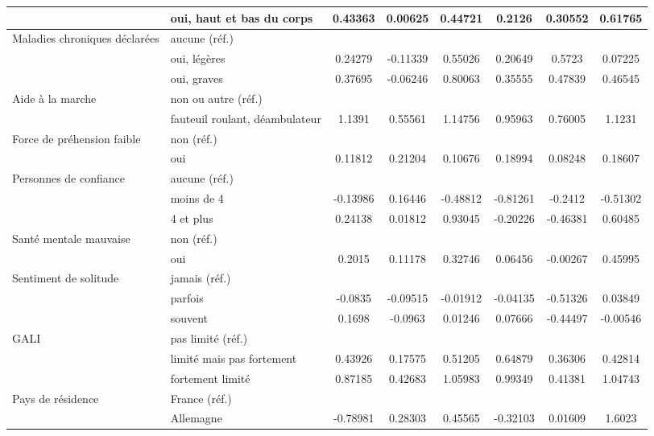 \begin{Article}
\begin{refsection}[Bonnal]
\begin{table}
{\begin{threeparttable}
\begin{tabular}{l@{}l@{} S!{\qquad}S!{\qquad}S!{\quad} |S!{\qquad}S!{\qquad}S!{\quad}}
	& oui, haut et bas du corps & 0.43363\sym{***} & 0.00625 & 0.44721\sym{***} & 0.2126 & 0.30552 & 0.61765\sym{***}\\\hline
	Maladies chroniques déclarées & aucune (réf.) && & && &\\
	& oui, légères & 0.24279\sym{**} & -0.11339 & 0.55026\sym{***} & 0.20649 & 0.5723 & 0.07225\\
	& oui, graves & 0.37695\sym{***} & -0.06246 & 0.80063\sym{***} & 0.35555 & 0.47839 & 0.46545\\\hline
	Aide à la marche & non ou autre (réf.) && & && &\\
	& fauteuil roulant, déambulateur & 1.1391\sym{***} & 0.55561\sym{***} & 1.14756\sym{***} & 0.95963\sym{***} & 0.76005\sym{***} & 1.1231\sym{***}\\\hline
	Force de préhension faible & non (réf.) && &  && & \\
	& oui & 0.11812 & 0.21204\sym{***} & 0.10676 & 0.18994\sym{*} & 0.08248 & 0.18607\\\hline
	Personnes de confiance & aucune (réf.) && &  && & \\
	& moins de 4 & -0.13986 & 0.16446 & -0.48812 & -0.81261\sym{**} & -0.2412 & -0.51302\\
	& 4 et plus & 0.24138\sym{*} & 0.01812 & 0.93045\sym{***} & -0.20226 & -0.46381 & 0.60485\sym{*}\\\hline
	Santé mentale mauvaise & non (réf.) && &&  & & \\
	& oui & 0.2015\sym{***} & 0.11178 & 0.32746\sym{***} & 0.06456 & -0.00267 & 0.45995\sym{***}\\\hline
	Sentiment de solitude& jamais (réf.) && &  && & \\
	& parfois & -0.0835 & -0.09515 & -0.01912 & -0.04135 & -0.51326\sym{***} & 0.03849\\
	& souvent & 0.1698\sym{**} & -0.0963 & 0.01246 & 0.07666 & -0.44497\sym{**} & -0.00546\\\hline
	GALI & pas limité (réf.) &  &  &  &  &  & \\
	& limité mais pas fortement & 0.43926\sym{***} & 0.17575\sym{**} & 0.51205\sym{***} & 0.64879\sym{***} & 0.36306 & 0.42814\sym{*}\\
	& fortement limité & 0.87185\sym{***} & 0.42683\sym{***} & 1.05983\sym{***} & 0.99349\sym{***} & 0.41381 & 1.04743\sym{***}\\\hline
	Pays de résidence & France (réf.) && & && &\\
	& Allemagne & -0.78981\sym{***} & 0.28303\sym{*} & 0.45565\sym{*} & -0.32103 & 0.01609 & 1.6023\sym{***}\\

\end{tabular}
\end{threeparttable}}
\end{table}
\end{refsection}
\end{Article}
